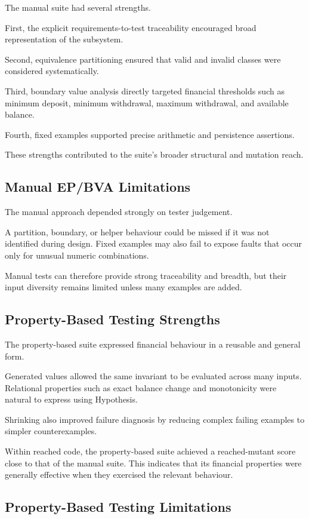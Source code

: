 \documentclass[12pt]{article}
\begin{document}
The manual suite had several strengths.

First, the explicit requirements-to-test traceability encouraged broad
representation of the subsystem.

Second, equivalence partitioning ensured that valid and invalid classes were
considered systematically.

Third, boundary value analysis directly targeted financial thresholds such as
minimum deposit, minimum withdrawal, maximum withdrawal, and available
balance.

Fourth, fixed examples supported precise arithmetic and persistence assertions.

These strengths contributed to the suite's broader structural and mutation
reach.

\subsection{Manual EP/BVA Limitations}

The manual approach depended strongly on tester judgement.

A partition, boundary, or helper behaviour could be missed if it was not
identified during design. Fixed examples may also fail to expose faults that
occur only for unusual numeric combinations.

Manual tests can therefore provide strong traceability and breadth, but their
input diversity remains limited unless many examples are added.

\subsection{Property-Based Testing Strengths}

The property-based suite expressed financial behaviour in a reusable and
general form.

Generated values allowed the same invariant to be evaluated across many
inputs. Relational properties such as exact balance change and monotonicity
were natural to express using Hypothesis.

Shrinking also improved failure diagnosis by reducing complex failing examples
to simpler counterexamples.

Within reached code, the property-based suite achieved a reached-mutant score
close to that of the manual suite. This indicates that its financial
properties were generally effective when they exercised the relevant
behaviour.

\subsection{Property-Based Testing Limitations}
\end{document}
